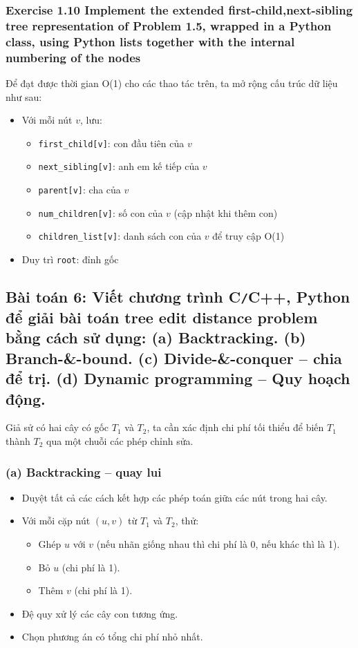 \documentclass{article}
\begin{document}
	\subsubsection*{ Exercise 1.10 Implement the extended first-child,next-sibling tree representation of Problem 1.5, wrapped in a Python class, using Python lists together with the internal numbering of the nodes}
	
	Để đạt được thời gian O(1) cho các thao tác trên, ta mở rộng cấu trúc dữ liệu như sau:
	
	\begin{itemize}
		\item Với mỗi nút \(v\), lưu:
		\begin{itemize}
			\item \texttt{first\_child[v]}: con đầu tiên của \(v\)
			\item \texttt{next\_sibling[v]}: anh em kế tiếp của \(v\)
			\item \texttt{parent[v]}: cha của \(v\)
			\item \texttt{num\_children[v]}: số con của \(v\) (cập nhật khi thêm con)
			\item \texttt{children\_list[v]}: danh sách con của \(v\) để truy cập O(1)
		\end{itemize}
		\item Duy trì \texttt{root}: đỉnh gốc
	\end{itemize}
	
	\subsection*{Bài toán 6: Viết chương trình {\sf C{\tt/}C++, Python} để giải bài toán tree edit distance problem bằng cách sử dụng: (a) Backtracking. (b) Branch-\&-bound. (c) Divide-\&-conquer -- chia để trị. (d) Dynamic programming -- Quy hoạch động.}
	
	Giả sử có hai cây có gốc $T_1$ và $T_2$, ta cần xác định chi phí tối thiểu để biến $T_1$ thành $T_2$ qua một chuỗi các phép chỉnh sửa.
	
	\subsubsection*{(a) Backtracking -- quay lui}
	
	\begin{itemize}
		\item Duyệt tất cả các cách kết hợp các phép toán giữa các nút trong hai cây.
		\item Với mỗi cặp nút $(u,v)$ từ $T_1$ và $T_2$, thử:
		\begin{itemize}
			\item Ghép $u$ với $v$ (nếu nhãn giống nhau thì chi phí là 0, nếu khác thì là 1).
			\item Bỏ $u$ (chi phí là 1).
			\item Thêm $v$ (chi phí là 1).
		\end{itemize}
		\item Đệ quy xử lý các cây con tương ứng.
		\item Chọn phương án có tổng chi phí nhỏ nhất.
	\end{itemize}
	
\end{document}
